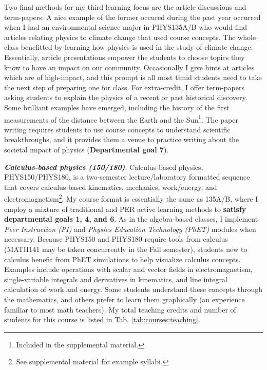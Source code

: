\documentclass[../../../main.tex]{subfiles}
\begin{document}
Two final methods for my third learning focus are the article discussions and term-papers.  A nice example of the former occured during the past year occurred when I had an environmental science major in PHYS135A/B who would find articles relating physics to climate change that used course concepts.  The whole class benefitted by learning how physics is used in the study of climate change.  Essentially, article presentations empower the students to choose topics they know to have an impact on our community.  Occasionally I give hints at articles which are of high-impact, and this prompt is all most timid students need to take the next step of preparing one for class.  For extra-credit, I offer term-papers asking students to explain the physics of a recent or past historical discovery.  Some brilliant examples have emerged, including the history of the first measurements of the distance between the Earth and the Sun\footnote{Included in the supplemental material.}.  The paper writing requires students to use course concepts to understand scientific breakthroughs, and it provides them a venue to practice writing about the societal impact of physics (\textbf{Departmental goal 7}).  \\ \hspace{0.1cm}

\textbf{\textit{Calculus-based physics (150/180)}}. Calculus-based physics, PHYS150/PHYS180, is a two-semester lecture/laboratory formatted sequence that covers calculus-based kinematics, mechanics, work/energy, and electromagnetism\footnote{See supplemental material for example syllabi.}.  My course format is essentially the same as 135A/B, where I employ a mixture of traditional and PER active learning methods to \textbf{satisfy departmental goals 1, 4, and 6}.  As in the algebra-based classes, I implement \textit{Peer Instruction (PI)} \cite{mazur2013peer} and \textit{Physics Education Technology (PhET)} \cite{phet} modules when necessary.  Because PHYS150 and PHYS180 require tools from calculus (MATH141 may be taken concurrently in the Fall semester), students new to calculus benefit from PhET simulations to help visualize calculus concepts.  Examples include operations with scalar and vector fields in electromagnetism, single-variable integrals and derivatives in kinematics, and line integral calculation of work and energy.  Some students understand these concepts through the mathematics, and others prefer to learn them graphically (an experience familiar to most math teachers).  My total teaching credits and number of students for this course is listed in Tab. \ref{tab:courses:teaching}. \\ \hspace{0.1cm}
\end{document}
